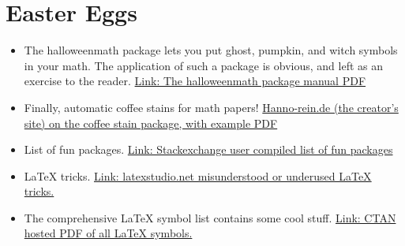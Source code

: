 \documentclass{article}
\newcommand{\latex}{\LaTeX \xspace}
\begin{document}
\section{Easter Eggs}
\begin{itemize}
    \item The halloweenmath package lets you put ghost, pumpkin, and witch symbols in your math. The application of such a package is obvious, and left as an exercise to the reader. \href{http://ftp.math.purdue.edu/mirrors/ctan.org/macros/latex/contrib/halloweenmath/halloweenmath-man.pdf}{Link: The halloweenmath package manual PDF}
    \item Finally, automatic coffee stains for math papers! \href{http://hanno-rein.de/archives/349}{Hanno-rein.de (the creator's site) on the coffee stain package, with example PDF}
    \item List of fun packages. \href{https://tex.stackexchange.com/questions/67656/are-there-other-fun-packages-like-the-coffee-stains-package}{Link: Stackexchange user compiled list of fun packages}
    \item \latex tricks. \href{http://static.latexstudio.net/wp-content/uploads/2015/01/LaTeX-Tricks-X.pdf}{Link: latexstudio.net misunderstood or underused \latex tricks.}
    \item The comprehensive \latex symbol list contains some cool stuff. \href{http://ctan.math.utah.edu/ctan/tex-archive/info/symbols/comprehensive/symbols-a4.pdf}{Link: CTAN hosted PDF of all \latex symbols.}
\end{itemize}
\end{document}

